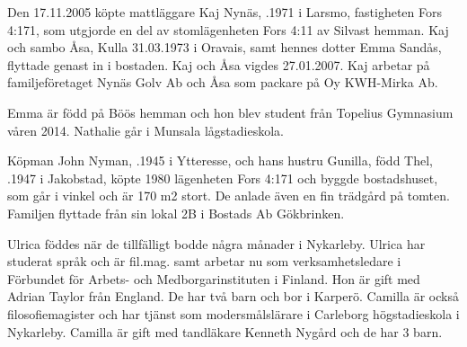Den 17.11.2005 köpte mattläggare Kaj Nynäs, .1971 i Larsmo, fastigheten Fors 4:171, som utgjorde en del av stomlägenheten Fors 4:11 av Silvast hemman.  Kaj och sambo Åsa, \textborn Kulla 31.03.1973 i Oravais, samt hennes dotter Emma Sandås, flyttade genast in i bostaden. Kaj och Åsa vigdes 27.01.2007. Kaj arbetar på familjeföretaget Nynäs Golv Ab och Åsa som packare på Oy KWH-Mirka Ab.
\begin{jhchildren}
  \item {}
  \item {}
  \item {}
\end{jhchildren}

Emma är född på Böös hemman och hon blev student från Topelius Gymnasium våren 2014. Nathalie går i Munsala lågstadieskola.


Köpman John Nyman, .1945 i Ytteresse, och hans hustru Gunilla, född Thel, .1947 i Jakobstad, köpte 1980 lägenheten Fors 4:171 och byggde bostadshuset, som går i vinkel och är 170 m2 stort. De anlade även en fin trädgård på tomten. Familjen flyttade från sin lokal 2B i Bostads Ab Gökbrinken.
\begin{jhchildren}
  \item {}
  \item {}
\end{jhchildren}
Ulrica föddes när de tillfälligt bodde några månader i Nykarleby. Ulrica har studerat språk och är fil.mag. samt arbetar nu som verksamhetsledare i Förbundet för Arbets- och Medborgarinstituten i Finland. Hon är gift med Adrian Taylor från England. De har två barn och bor i Karperö. Camilla är också filosofiemagister och har tjänst som modersmålslärare i Carleborg högstadieskola i Nykarleby. Camilla är gift med tandläkare Kenneth Nygård och de har 3 barn.

